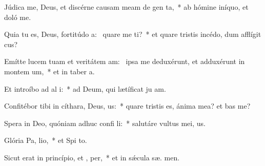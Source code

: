 \item Júdica me, Deus, et discérne causam meam de gen  ta,~* ab hómine iníquo, et doló  me.
\item Quia tu es, Deus, fortitúdo a:~\pscross{} quare me ti?~* et quare tristis incédo, dum afflígit  cus?
\item Emítte lucem tuam et veritátem am:~\pscross{} ipsa me deduxérunt, et adduxérunt in montem  um,~* et in taber a.
\item Et introíbo ad al i:~* ad Deum, qui lætíficat ju am.
\item Confitébor tibi in cíthara, Deus,  us:~* quare tristis es, ánima mea? et  bas me?
\item Spera in Deo, quóniam adhuc confi li:~* salutáre vultus mei,   us.
\item Glória Pa,  lio,~* et Spi to.
\item Sicut erat in princípio, et ,  per,~* et in sǽcula sæ. men.
